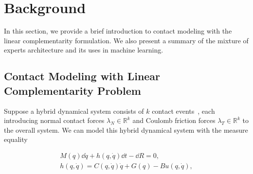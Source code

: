 
\section{Background}

In this section, we provide a brief introduction to contact modeling with the
linear complementarity formulation.
%
We also present a summary of the mixture of experts architecture and
its uses in machine learning.

\subsection{Contact Modeling with Linear Complementarity Problem}

Suppose a hybrid dynamical system consists of $k$ contact events~, each
introducing normal contact forces $\lambda_N \in \mathbb{R}^{k}$ and Coulomb
friction forces $\lambda_T \in \mathbb{R}^{k}$ to the overall system.
%
We can model this hybrid dynamical system with the measure equality~\cite{glocker2005formulation}

\begin{equation}
  \begin{gathered}
    M(q) \dd \dot{q} + h(q, \dot{q})\dd t - \dd R  = 0, \\
    h(q, \dot{q}) = C(q, \dot{q})\dot{q} + G(q) - Bu(q, \dot{q}), 
  \end{gathered}
  \label{eq:hybrid_dynamics}
\end{equation}

